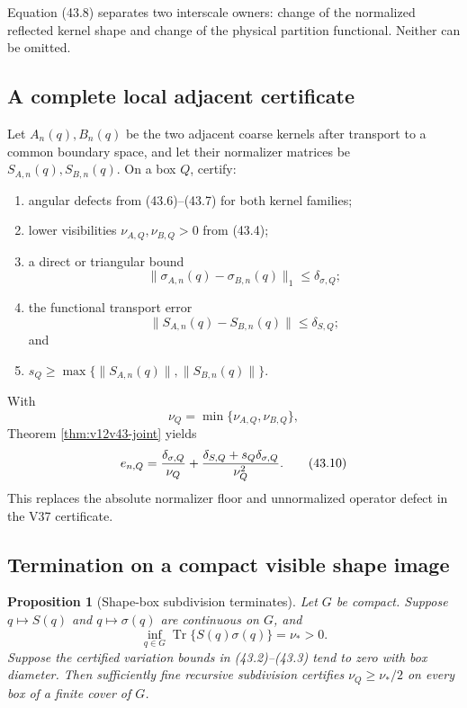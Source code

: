 \documentclass[11pt]{article}
\newtheorem{proposition}[theorem]{Proposition}
\theoremstyle{remark}
\begin{document}
Equation (43.8) separates two interscale owners: change of the
normalized reflected kernel shape and change of the physical
partition functional.  Neither can be omitted.

\subsection{A complete local adjacent certificate}

Let \(A_n(q),B_n(q)\) be the two adjacent coarse kernels after
transport to a common boundary space, and let their normalizer
matrices be \(S_{A,n}(q),S_{B,n}(q)\).  On a box \(Q\), certify:

\begin{enumerate}
\item angular defects from (43.6)--(43.7) for both kernel families;
\item lower visibilities
\(\nu_{A,Q},\nu_{B,Q}>0\) from (43.4);
\item a direct or triangular bound
\[
 \|\sigma_{A,n}(q)-\sigma_{B,n}(q)\|_1
 \leq\delta_{\sigma,Q};
\]
\item the functional transport error
\[
 \|S_{A,n}(q)-S_{B,n}(q)\|\leq\delta_{S,Q};
\]
and
\item \(s_Q\geq\max\{\|S_{A,n}(q)\|,\|S_{B,n}(q)\|\}\).
\end{enumerate}

With
\[
 \nu_Q=\min\{\nu_{A,Q},\nu_{B,Q}\},
\]
Theorem \ref{thm:v12v43-joint} yields
\begin{equation}
 e_{n,Q}
 =
 {\delta_{\sigma,Q}\over\nu_Q}
 +
 {\delta_{S,Q}+s_Q\delta_{\sigma,Q}\over\nu_Q^2}.
                                                        \tag{43.10}
\end{equation}
This replaces the absolute normalizer floor and unnormalized
operator defect in the V37 certificate.

\subsection{Termination on a compact visible shape image}

\begin{proposition}[Shape-box subdivision terminates]
\label{prop:v12v43-termination}
Let \(G\) be compact.  Suppose \(q\mapsto S(q)\) and
\(q\mapsto\sigma(q)\) are continuous on \(G\), and
\begin{equation}
 \inf_{q\in G}\operatorname{Tr}\{S(q)\sigma(q)\}
 =\nu_*>0.                                       \tag{43.11}
\end{equation}
Suppose the certified variation bounds in (43.2)--(43.3) tend to
zero with box diameter.  Then sufficiently fine recursive
subdivision certifies \(\nu_Q\geq\nu_*/2\) on every box of a finite
cover of \(G\).
\end{proposition}
\end{document}

